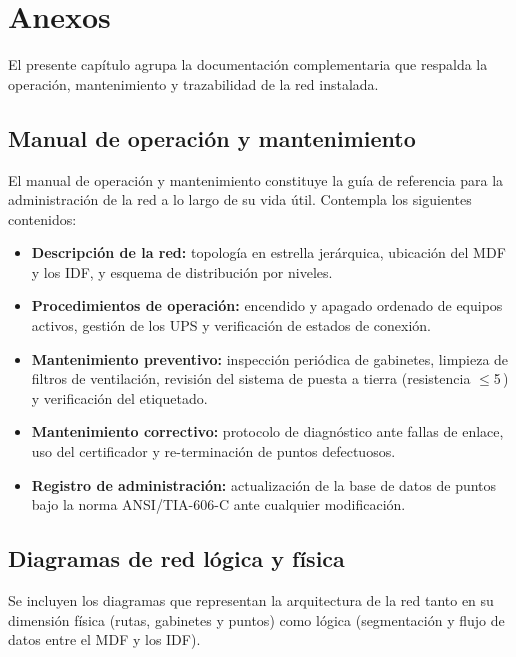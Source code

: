 \chapter{Anexos}

El presente capítulo agrupa la documentación complementaria que respalda
la operación, mantenimiento y trazabilidad de la red instalada.

\section{Manual de operación y mantenimiento}

El manual de operación y mantenimiento constituye la guía de referencia
para la administración de la red a lo largo de su vida útil. Contempla
los siguientes contenidos:

\begin{itemize}
\item \textbf{Descripción de la red:} topología en estrella jerárquica,
ubicación del MDF y los IDF, y esquema de distribución por niveles.
\item \textbf{Procedimientos de operación:} encendido y apagado
ordenado de equipos activos, gestión de los UPS y verificación de
estados de conexión.
\item \textbf{Mantenimiento preventivo:} inspección periódica de
gabinetes, limpieza de filtros de ventilación, revisión del sistema de
puesta a tierra (resistencia $\leq$5\,\textohm) y verificación del
etiquetado.
\item \textbf{Mantenimiento correctivo:} protocolo de diagnóstico ante
fallas de enlace, uso del certificador y re-terminación de puntos
defectuosos.
\item \textbf{Registro de administración:} actualización de la base de
datos de puntos bajo la norma ANSI/TIA-606-C ante cualquier
modificación.
\end{itemize}

\section{Diagramas de red lógica y física}

Se incluyen los diagramas que representan la arquitectura de la red
tanto en su dimensión física (rutas, gabinetes y puntos) como lógica
(segmentación y flujo de datos entre el MDF y los IDF).



